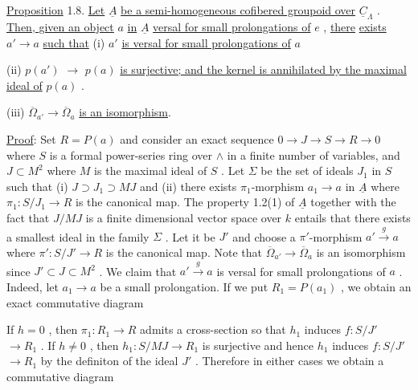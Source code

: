 \underline{Proposition} 1.8.   \underline{Let}  $\underline{A}$  \underline{be a semi-homogeneous cofibered groupoid over}  $\underline{C}_{\Lambda}$  . \underline{Then, given an object}  $a$  \underline{in}  $\underline{A}$  \underline{versal for small prolongations of}  $e$  , \underline{there} \underline{exists}  $a' \rightarrow a$  \underline{such that}
(i)  $a'$  \underline{is versal for small prolongations of}  $a$

(ii)  $p(a')$ $\longrightarrow$ $p(a)$  \underline{is surjective; and the kernel is annihilated by the maximal ideal of}  $p(a)$  .

(iii)  $\overline{\Omega}_{a'} \longrightarrow \overline{\Omega}_{a}$  \underline{is an isomorphism}.

\underline{Proof}:  Set  $R = P(a)$  and consider an exact sequence  $0 \to J \to S \to R \to 0$  where $S$  is a formal power-series ring over  $\wedge$  in a finite number of variables, and $J \subset M^2$  where  $M$  is the maximal ideal of  $S$  . Let  $\Sigma$  be the set of ideals  $J_1$ in  $S$  such that (i)  $J \supset J_1 \supset MJ$  and (ii) there exists  $\pi_1$-morphism  $a_1 \to a$  in  $\underline{A}$  where  $\pi_1 : S/J_1 \to R$  is the canonical map. The property 1.2(1) of  $\underline{A}$  together with the fact that  $J/MJ$  is a finite dimensional vector space over  $k$  entails that there exists a smallest ideal in the family  $\Sigma$  . Let it be  $J'$  and choose a  $\pi'$-morphism  $a' \overset{g}{\to} a$  where  $\pi' : S/J' \to R$  is the canonical map. Note that $\overline{\Omega}_{a'} \to \overline{\Omega}_{a}$  is an isomorphism since  $J' \subset J \subset M^2$  . We claim that  $a' \overset{g}{\to} a$  is versal for small prolongations of  $a$  . Indeed, let  $a_1 \to a$  be a small prolongation. If we put  $R_1 = P(a_1)$  , we obtain an exact commutative diagram

\begin{center}
\end{center}
If  $h = 0$  , then  $\pi_1 : R_1 \to R$  admits a cross-section so that  $h_1$  induces $f : S/J'$ $\to R_1$  . If  $h \neq 0$  , then  $h_1 : S/MJ \to R_1$  is surjective and hence  $h_1$ induces  $f : S/J'$ $\to R_1$  by the definiton of the ideal  $J'$  . Therefore in either cases we obtain a commutative diagram

